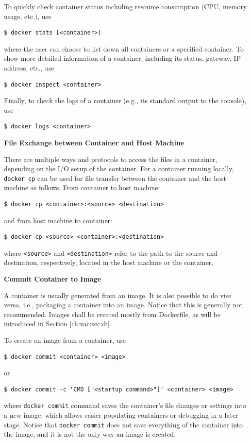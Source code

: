 To quickly check container status including resource consumption (CPU, memory usage, etc.), use
\begin{lstlisting}
$ docker stats [<container>]
\end{lstlisting}
where the user can choose to list down all containers or a specified container. To show more detailed information of a container, including its status, gateway, IP address, etc., use
\begin{lstlisting}
$ docker inspect <container>
\end{lstlisting}
Finally, to check the logs of a container (e.g., its standard output to the console), use
\begin{lstlisting}
$ docker logs <container>
\end{lstlisting}

\vspace{0.1in}
\noindent \textbf{File Exchange between Container and Host Machine}
\vspace{0.1in}

There are multiple ways and protocols to access the files in a container, depending on the I/O setup of the container. For a container running locally, \verb|docker cp| can be used for file transfer between the container and the host machine as follows. From container to host machine:
\begin{lstlisting}
$ docker cp <container>:<source> <destination>
\end{lstlisting}
and from host machine to container:
\begin{lstlisting}
$ docker cp <source> <container>:<destination>
\end{lstlisting}
where \verb|<source>| and \verb|<destination>| refer to the path to the source and destination, respectively, located in the host machine or the container.

\vspace{0.1in}
\noindent \textbf{Commit Container to Image}
\vspace{0.1in}

A container is usually generated from an image. It is also possible to do vise versa, i.e., packaging a container into an image. Notice that this is generally not recommended. Images shall be created mostly from Dockerfile, as will be introduced in Section \ref{ch:vac:sec:di}.

To create an image from a container, use
\begin{lstlisting}
$ docker commit <container> <image>
\end{lstlisting}
or
\begin{lstlisting}
$ docker commit -c 'CMD ["<startup command>"]' <container> <image>
\end{lstlisting}
where \verb|docker commit| command saves the container's file changes or settings into a new image, which allows easier populating containers or debugging in a later stage. Notice that \verb|docker commit| does not save everything of the container into the image, and it is not the only way an image is created.

